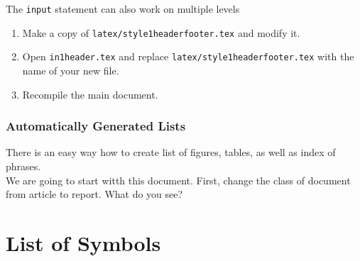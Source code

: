 \documentclass[a4paper,10pt]{report} %
\begin{document}
The \texttt{input} statement can also work on multiple levels
\begin{enumerate}
    \item Make a copy of \texttt{latex/style1headerfooter.tex} and modify it.
    \item Open \texttt{in1header.tex} and replace \texttt{latex/style1headerfooter.tex} with the name of your new file.
    \item Recompile the main document.
\end{enumerate}



\subsection{Automatically Generated Lists}\label{sec:automatic}
There is an easy way how to create list of figures, tables, as well as index of phrases.\\


 We are going to start witth this document. First, change the class of document from article to report. What do you see?\\

 


 \maketitle
   \let\clearpage\relax 
   \tableofcontents
    \label{contents}
    \listoftables    
    \listoffigures
    \chapter*{List of Symbols}
    
 \newpage

\end{document}
